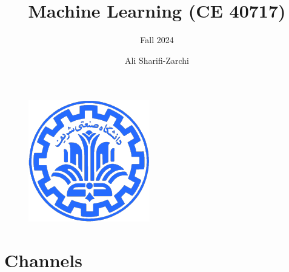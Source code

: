 \documentclass[default, aspectratio=169]{beamer}
\author{Ali Sharifi-Zarchi}
\title{Machine Learning (CE 40717)}
\subtitle{Fall 2024}
\institute{
	CE Department \\
	Sharif University of Technology
}
\begin{document}
	
	
	
	\begin{frame}
		\titlepage
		\vspace*{-0.6cm}
		\begin{figure}[htpb]
			\begin{center}
				\includegraphics[keepaspectratio, scale=0.25]{pic/sharif-main-logo.png}
			\end{center}
		\end{figure}
	\end{frame}
	
	\begin{frame}    
		\tableofcontents[sectionstyle=show,
		subsectionstyle=show/shaded/hide,
		subsubsectionstyle=show/shaded/hide]
	\end{frame}
	\section{Channels}
	
\end{document}
